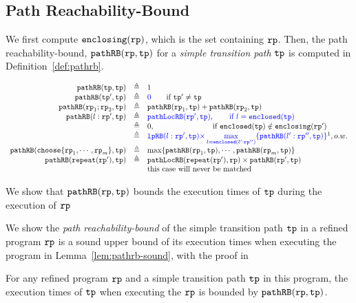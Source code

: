 \subsection{Path Reachability-Bound}
\label{sec:pathrb}
We first compute $\mathtt{enclosing}(\mathtt{rp})$, which is the set containing  $\mathtt{rp}$.
Then, the path reachability-bound, $\mathtt{pathRB}(\mathtt{rp}, \mathtt{tp})$ for a \emph{simple transition path} $\mathtt{tp}$ is computed in Definition~\ref{def:pathrb}.
%
\begin{defn}[]
  \label{def:pathrb}
\[
  \begin{array}{rcl}
    \inoutB(\tpath, \tpath) & \triangleq & 1  \\
    \inoutB(\tpath', \tpath) & \triangleq & \highlight{0} \qquad \text{if } \tpath' \neq \tpath\\
    \inoutB(\rprog_1;\rprog_2, \tpath) & \triangleq & \inoutB(\rprog_1, \tpath) + \inoutB(\rprog_2, \tpath) \\
    \inoutB(l: \rprog', \tpath) & \triangleq & 
    \highlight{\outinB(\rprog', \tpath), \qquad \text{if } l = \kw{enclosed}(\tpath)}
    \\
    &  \triangleq & 
   0, \qquad \qquad \qquad \quad ~~ \text{if }  \kw{enclosed}(\tpath) \notin \kw{enclosing}(\rprog')
    \\
    &  \triangleq & 
    \highlight{
      \lpchB(l:\rprog', \tpath ) }
    \highlight{\times \max\limits_{l = \kw{enclosed}(l':\rprog'')}
   \{\inoutB(l':\rprog'', \tpath)\} } \footnotemark, o.w. \\
    \inoutB(\rpchoose{\rprog_1, \cdots, \rprog_m }, \tpath) & \triangleq 
    & \max\left\{ \inoutB(\rprog_1, \tpath), \cdots, \inoutB(\rprog_m, \tpath) \right\} 
    \\
    \inoutB(\rprepeat(\rprog'), \tpath) & \triangleq & \outinB(\rprepeat(\rprog'), \rprog) \times \inoutB(\rprog', \tpath)\\
    &  & \text{this case will never be matched}
    \end{array}
  \]
  \end{defn}
%
We show that $\mathtt{pathRB}(\mathtt{rp}, \mathtt{tp})$ bounds the execution times of $\mathtt{tp}$ during the execution of $\mathtt{rp}$

We show the \emph{path reachability-bound} of the simple transition path $\mathtt{tp}$ in a refined program $\mathtt{rp}$ is a sound upper bound of its execution times when executing the program in Lemma~\ref{lem:pathrb-sound}, with the proof in 
\begin{lem}
  \label{lem:pathrb-sound}
  For any refined program $\mathtt{rp}$ and a simple transition path $\mathtt{tp}$ in this program,
  the execution times of $\mathtt{tp}$ when executing the $\mathtt{rp}$ is bounded by $\mathtt{pathRB}(\mathtt{rp}, \mathtt{tp})$.
\end{lem}

